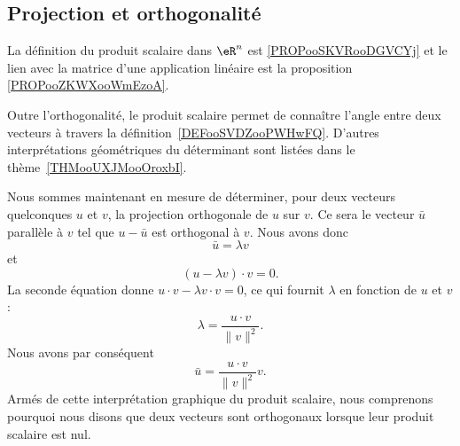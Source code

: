 \subsection{Projection et orthogonalité}

La définition du produit scalaire dans \( \eR^n\) est \ref{PROPooSKVRooDGVCYj} et le lien avec la matrice d'une application linéaire est la proposition \ref{PROPooZKWXooWmEzoA}.

\begin{remark}
	Outre l'orthogonalité, le produit scalaire permet de connaître l'angle entre deux vecteurs à travers la définition~\ref{DEFooSVDZooPWHwFQ}. D'autres interprétations géométriques du déterminant sont listées dans le thème~\ref{THMooUXJMooOroxbI}.
\end{remark}

Nous sommes maintenant en mesure de déterminer, pour deux vecteurs quelconques \( u\) et \( v\), la projection orthogonale de \( u\) sur \( v\). Ce sera le vecteur \( \bar u\) parallèle à \( v\) tel que \( u-\bar u\) est orthogonal à \( v\). Nous avons donc
\begin{equation}
	\bar u=\lambda v
\end{equation}
et
\begin{equation}
	(u-\lambda v)\cdot v=0.
\end{equation}
La seconde équation donne \( u\cdot v-\lambda v\cdot v=0\), ce qui fournit \( \lambda\) en fonction de \( u\) et \( v\) :
\begin{equation}
	\lambda=\frac{ u\cdot v }{ \| v \|^2 }.
\end{equation}
Nous avons par conséquent
\begin{equation}
	\bar u=\frac{ u\cdot v }{ \| v \|^2 }v.
\end{equation}
Armés de cette interprétation graphique du produit scalaire, nous comprenons pourquoi nous disons que deux vecteurs sont orthogonaux lorsque leur produit scalaire est nul.

